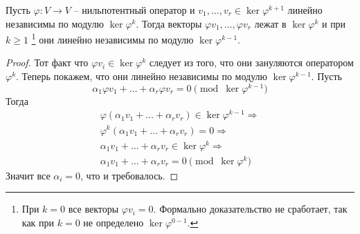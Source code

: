 \begin{claim}
\label{claim::LinIndepModKer}
Пусть $\varphi\colon V\to V$ -- нильпотентный оператор и $v_1,\ldots,v_r\in \ker \varphi^{k+1}$ линейно независимы по модулю $\ker \varphi^k$.
Тогда векторы $\varphi v_1,\ldots,\varphi v_r$ лежат в $\ker \varphi^k$ и при $k \geqslant 1$%
\footnote{При $k = 0$ все векторы $\varphi v_i = 0$.
Формально доказательство не сработает, так как при $k = 0$ не определено $\ker \varphi^{0 - 1}$.}
они линейно независимы по модулю $\ker \varphi^{k-1}$.
\end{claim}
\begin{proof}
Тот факт что $\varphi v_i\in \ker \varphi^{k}$ следует из того, что они зануляются оператором $\varphi^k$.
Теперь покажем, что они линейно независимы по модулю $\ker \varphi^{k-1}$.
Пусть 
\[
\alpha_1 \varphi v_1 + \ldots + \alpha_r \varphi v_r = 0 \pmod{\ker \varphi^{k-1}}
\]
Тогда
\begin{gather*}
\varphi(\alpha_1 v_1 + \ldots + \alpha_r v_r)\in \ker \varphi^{k-1}\Rightarrow\\
\varphi^k(\alpha_1 v_1 + \ldots + \alpha_r v_r) = 0\Rightarrow\\
\alpha_1v_1 +\ldots + \alpha_r v_r \in \ker\varphi^k\Rightarrow\\
\alpha_1 v_1 + \ldots + \alpha_r v_r = 0 \pmod{\ker \varphi^k}
\end{gather*}
Значит все $\alpha_i = 0$, что и требовалось.
\end{proof}

